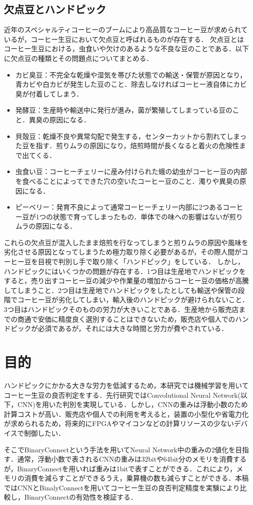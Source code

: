 \subsection{欠点豆とハンドピック}
近年のスペシャルティコーヒーのブームにより高品質なコーヒー豆が求められているが，コーヒー生豆において欠点豆と呼ばれるものが存在する．
欠点豆とはコーヒー生豆における，虫食いや欠けのあるような不良な豆のことである．以下に欠点豆の種類とその問題点についてまとめる\cite{coffeetaizenn}．
\begin{itemize}
  \item カビ臭豆：不完全な乾燥や湿気を帯びた状態での輸送・保管が原因となり，青カビや白カビが発生した豆のこと．除去しなければコーヒー液自体にカビ臭が付着してしまう．
  \item 発酵豆：生産時や輸送中に発行が進み，菌が繁殖してしまっている豆のこと．異臭の原因になる．
  \item 貝殻豆：乾燥不良や異常勾配で発生する，センターカットから割れてしまった豆を指す．煎りムラの原因になり，焙煎時間が長くなると着火の危険性まで出てくる．
  \item 虫食い豆：コーヒーチェリーに産み付けられた蛾の幼虫がコーヒー豆の内部を食べることによってできた穴の空いたコーヒー豆のこと．濁りや異臭の原因になる．
  \item ピーベリー：発育不良によって通常コーヒーチェリー内部に2つあるコーヒー豆が1つの状態で育ってしまったもの．単体での味への影響はないが煎りムラの原因になる．
\end{itemize}

これらの欠点豆が混入したまま焙煎を行なってしまうと煎りムラの原因や風味を劣化させる原因となってしまうため極力取り除く必要があるが，その際人間がコーヒー豆を目視で判別し手で取り除く「ハンドピック」をしている．
しかし，ハンドピックにはいくつかの問題が存在する．1つ目は生産地でハンドピックをすると，売り出すコーヒー豆の減少や作業量の増加からコーヒー豆の価格が高騰してしまうこと．2つ目は生産地でハンドピックをしたとしても輸送や保管の段階でコーヒー豆が劣化してしまい，輸入後のハンドピックが避けられないこと．3つ目はハンドピックそのものの労力が大きいことである．生産地から販売店までの商通で安価に精度良く選別することはできないため，販売店や個人でのハンドピックが必須であるが，それには大きな時間と労力が費やされている．

\section{目的}
ハンドピックにかかる大きな労力を低減するため，本研究では機械学習を用いてコーヒー生豆の良否判定をする．先行研究ではConvolutional Neural Network(以下，CNN)を用いた判別を実現している．しかし，CNNの重みは浮動小数のため計算コストが高い．販売店や個人での利用を考えると，装置の小型化や省電力化が求められるため，将来的にFPGAやマイコンなどの計算リソースの少ないデバイスで制御したい．

そこでBinaryConnectという手法を用いてNeural Network中の重みの2値化を目指す．通常，浮動小数で表されるCNNの重みは32bitや64bit分のメモリを消費するが，BinaryConnectを用いれば重みは1bitで表すことができる．これにより，メモリの消費を減らすことができるうえ，乗算機の数も減らすことができる．本稿ではCNNとBinalyConnectを用いてコーヒー生豆の良否判定精度を実験により比較し，BinaryConnectの有効性を検証する．
